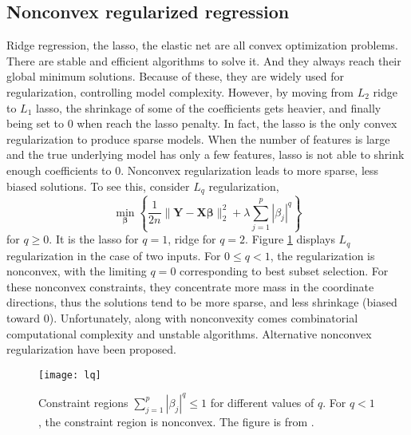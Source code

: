 \subsection{Nonconvex regularized regression} \label{sec:nonconvex}
Ridge regression, the lasso, the elastic net are all convex optimization problems. There are stable and efficient algorithms to solve it. And they always reach their global minimum solutions. Because of these, they are widely used for regularization, controlling model complexity. However, by moving from $L_2$ ridge to $L_1$ lasso, the shrinkage of some of the coefficients gets heavier, and finally being set to 0 when reach the lasso penalty. In fact, the lasso is the only convex regularization to produce sparse models. When the number of features is large and the true underlying model has only a few features, lasso is not able to shrink enough coefficients to 0. Nonconvex regularization leads to more sparse, less biased solutions. To see this, consider $L_q$ regularization,
\begin{equation}
    \min_{\bm{\beta}} \left\{ \frac{1}{2n}\|\bm{Y} - \bm{X\beta}\|_2^2 + \lambda \sum_{j=1}^{p}|\beta_j|^q \right\} \label{eq1.15}
\end{equation}
for $q\geq0$. It is the lasso for $q=1$, ridge for $q=2$. Figure \ref{fig:lq} displays $L_q$ regularization in the case of two inputs. For $0 \leq q <1$, the regularization is nonconvex, with the limiting $q=0$ corresponding to best subset selection. For these nonconvex constraints, they concentrate more mass in the coordinate directions, thus the solutions tend to be more sparse, and less shrinkage (biased toward 0). Unfortunately, along with nonconvexity comes combinatorial computational complexity and unstable algorithms. Alternative nonconvex regularization have been proposed.
\begin{figure}[tbh]
  \centering
  \texttt{[image: lq]}
  \caption[Constraint regions $\sum_{j=1}^p|\beta_j|^q\leq1$ for different values of $q$] {
    Constraint regions $\sum_{j=1}^p|\beta_j|^q\leq1$ for different values of $q$. For $q<1$, the constraint region is nonconvex. The figure is from \cite{hastie2009elements}. 
  }
  \label{fig:lq}
\end{figure}

